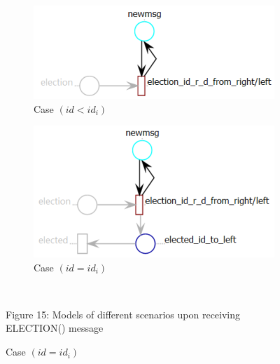\documentclass{article}
\begin{document}
\begin{figure}[ht]
\begin{subfigure}[b]{0.5\linewidth}
		\end{subfigure} 
		\begin{subfigure}[b]{0.5\linewidth}
			\centering
			\hspace*{-40pt}
			\includegraphics[scale=0.6]{election_cas3} 
			\caption{Case $(id<id_i)$} 
			\label{fig13:c} 
		\end{subfigure}%
		\begin{subfigure}[b]{0.5\linewidth}
			\centering
			\hspace*{20pt}
			\includegraphics[scale=0.6]{election_cas4} 
			\caption{Case $(id=id_i)$} 
			\label{fig13:d} 
		\end{subfigure} 
		\\\begin{center}
			Figure 15: Models of different scenarios upon receiving ELECTION() message
		\end{center}
		\label{fig13} 
	\end{figure}
\end{document}
